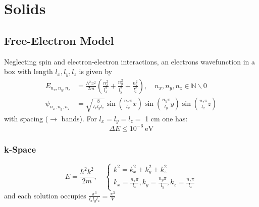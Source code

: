 \section{Solids}
\subsection{Free-Electron Model}\label{ssec:FEM}
Neglecting spin and electron-electron interactions, an electrons wavefunction in a box with length $l_x,l_y,l_z$ is given by
\noindent\begin{align*}
    E_{n_x,n_y,n_z}    & = \frac{\hbar^2\pi^2}{2m}\left(\frac{n_x^2}{l_x^2}+\frac{n_y^2}{l_y^2}+\frac{n_z^2}{l_z^2}\right),\quad n_x,n_y,n_z \in \mathbb{N}\backslash 0 \\
    \psi_{n_x,n_y,n_z} & = \sqrt{\frac{8}{l_x l_y l_z}} \sin\left(\frac{n_x\pi}{l_x}x\right) \sin\left(\frac{n_y\pi}{l_y}y\right) \sin\left(\frac{n_z\pi}{l_z}z\right)
\end{align*}
with spacing ($\to$ bands). For $l_x=l_y=l_z=$ 1 cm one has:
\noindent\begin{equation*}
    \Delta E \leq 10^{-6} ~\mathrm{eV}
\end{equation*}

\subsubsection{k-Space}
\noindent\begin{equation*}
    E = \frac{\hbar^2k^2}{2m}, \quad \begin{cases}
        k^2 = k_x^2+k_y^2+k_z^2 \\
        k_x = \frac{n_x\pi}{l_x}, k_y = \frac{n_y\pi}{l_y}, k_z = \frac{n_z\pi}{l_z}
    \end{cases}
\end{equation*}
and each solution occupies $\frac{\pi^3}{l_x l_y l_z}=\frac{\pi^3}{V}$

